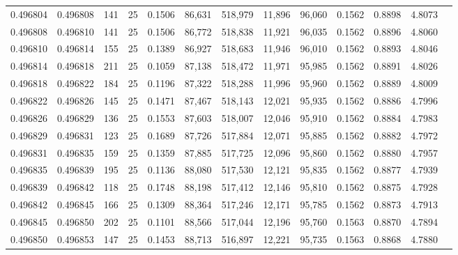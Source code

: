 \begin{tabular}{rrrrrrrrrrrrr}
0.496804 & 0.496808 & 141 &  25 &                                     0.1506 &  86,631 & 518,979 &  11,896 &  96,060 & 0.1562 & 0.8898 & 4.8073 \\
0.496808 & 0.496810 & 141 &  25 &                                     0.1506 &  86,772 & 518,838 &  11,921 &  96,035 & 0.1562 & 0.8896 & 4.8060 \\
0.496810 & 0.496814 & 155 &  25 &                                     0.1389 &  86,927 & 518,683 &  11,946 &  96,010 & 0.1562 & 0.8893 & 4.8046 \\
0.496814 & 0.496818 & 211 &  25 &                                     0.1059 &  87,138 & 518,472 &  11,971 &  95,985 & 0.1562 & 0.8891 & 4.8026 \\
0.496818 & 0.496822 & 184 &  25 &                                     0.1196 &  87,322 & 518,288 &  11,996 &  95,960 & 0.1562 & 0.8889 & 4.8009 \\
0.496822 & 0.496826 & 145 &  25 &                                     0.1471 &  87,467 & 518,143 &  12,021 &  95,935 & 0.1562 & 0.8886 & 4.7996 \\
0.496826 & 0.496829 & 136 &  25 &                                     0.1553 &  87,603 & 518,007 &  12,046 &  95,910 & 0.1562 & 0.8884 & 4.7983 \\
0.496829 & 0.496831 & 123 &  25 &                                     0.1689 &  87,726 & 517,884 &  12,071 &  95,885 & 0.1562 & 0.8882 & 4.7972 \\
0.496831 & 0.496835 & 159 &  25 &                                     0.1359 &  87,885 & 517,725 &  12,096 &  95,860 & 0.1562 & 0.8880 & 4.7957 \\
0.496835 & 0.496839 & 195 &  25 &                                     0.1136 &  88,080 & 517,530 &  12,121 &  95,835 & 0.1562 & 0.8877 & 4.7939 \\
0.496839 & 0.496842 & 118 &  25 &                                     0.1748 &  88,198 & 517,412 &  12,146 &  95,810 & 0.1562 & 0.8875 & 4.7928 \\
0.496842 & 0.496845 & 166 &  25 &                                     0.1309 &  88,364 & 517,246 &  12,171 &  95,785 & 0.1562 & 0.8873 & 4.7913 \\
0.496845 & 0.496850 & 202 &  25 &                                     0.1101 &  88,566 & 517,044 &  12,196 &  95,760 & 0.1563 & 0.8870 & 4.7894 \\
0.496850 & 0.496853 & 147 &  25 &                                     0.1453 &  88,713 & 516,897 &  12,221 &  95,735 & 0.1563 & 0.8868 & 4.7880 \\

\end{tabular}
